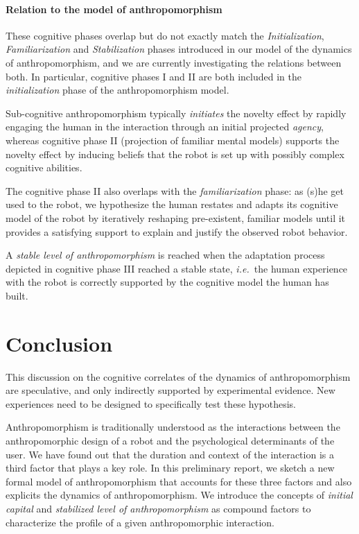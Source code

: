 \documentclass{sig-alternate-2013}
\newcommand{\ie}{{\textit{i.e.~}}}
\begin{document}
\paragraph{Relation to the model of anthropomorphism} 

These cognitive phases overlap but do not exactly match the
\emph{Initialization}, \emph{Familiarization} and \emph{Stabilization} phases
introduced in our model of the dynamics of anthropomorphism, and we are
currently investigating the relations between both. In particular, cognitive
phases I and II are both included in the \emph{initialization} phase of the
anthropomorphism model.

Sub-cognitive anthropomorphism typically \emph{initiates} the novelty effect by
rapidly engaging the human in the interaction through an initial projected
\emph{agency}, whereas cognitive phase II (projection of familiar mental models)
supports the novelty effect by inducing beliefs that the robot is set up with
possibly complex cognitive abilities.

The cognitive phase II also overlaps with the \emph{familiarization} phase: as
(s)he get used to the robot, we hypothesize the human restates and adapts its
cognitive model of the robot by iteratively reshaping pre-existent, familiar
models until it provides a satisfying support to explain and justify the
observed robot behavior.

A \emph{stable level of anthropomorphism} is reached when the adaptation process
depicted in cognitive phase III reached a stable state, \ie the human experience
with the robot is correctly supported by the cognitive model the human has
built.

\section{Conclusion}
\label{sec:conclusion}

This discussion on the cognitive correlates of the dynamics of anthropomorphism
are speculative, and only indirectly supported by experimental evidence. New
experiences need to be designed to specifically test these
hypothesis.


Anthropomorphism is traditionally understood as the interactions between the
anthropomorphic design of a robot and the psychological determinants of the
user. We have found out that the duration and context of the interaction is a
third factor that plays a key role. In this preliminary report, we sketch a new
formal model of anthropomorphism that accounts for these three factors and also
explicits the dynamics of anthropomorphism. We introduce the concepts of
\emph{initial capital} and \emph{stabilized level of anthropomorphism} as
compound factors to characterize the profile of a given anthropomorphic
interaction.
\end{document}
